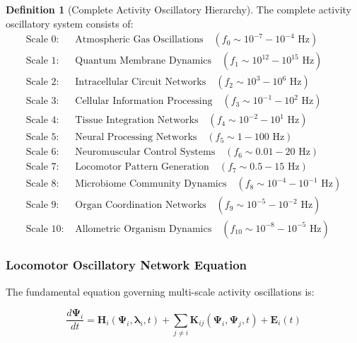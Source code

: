 \documentclass[12pt,a4paper]{article}
\theoremstyle{definition}
\newtheorem{definition}{Definition}[section]
\begin{document}
\begin{definition}[Complete Activity Oscillatory Hierarchy]
The complete activity oscillatory system consists of:
\begin{align}
\text{Scale 0: } &\text{Atmospheric Gas Oscillations} \quad (f_0 \sim 10^{-7}-10^{-4} \text{ Hz}) \label{eq:atmospheric} \\
\text{Scale 1: } &\text{Quantum Membrane Dynamics} \quad (f_1 \sim 10^{12}-10^{15} \text{ Hz}) \label{eq:quantum} \\
\text{Scale 2: } &\text{Intracellular Circuit Networks} \quad (f_2 \sim 10^{3}-10^{6} \text{ Hz}) \label{eq:intracellular} \\
\text{Scale 3: } &\text{Cellular Information Processing} \quad (f_3 \sim 10^{-1}-10^{2} \text{ Hz}) \label{eq:cellular} \\
\text{Scale 4: } &\text{Tissue Integration Networks} \quad (f_4 \sim 10^{-2}-10^{1} \text{ Hz}) \label{eq:tissue} \\
\text{Scale 5: } &\text{Neural Processing Networks} \quad (f_5 \sim 1-100 \text{ Hz}) \label{eq:neural} \\
\text{Scale 6: } &\text{Neuromuscular Control Systems} \quad (f_6 \sim 0.01-20 \text{ Hz}) \label{eq:neuromuscular} \\
\text{Scale 7: } &\text{Locomotor Pattern Generation} \quad (f_7 \sim 0.5-15 \text{ Hz}) \label{eq:locomotor} \\
\text{Scale 8: } &\text{Microbiome Community Dynamics} \quad (f_8 \sim 10^{-4}-10^{-1} \text{ Hz}) \label{eq:microbiome} \\
\text{Scale 9: } &\text{Organ Coordination Networks} \quad (f_9 \sim 10^{-5}-10^{-2} \text{ Hz}) \label{eq:organ} \\
\text{Scale 10: } &\text{Allometric Organism Dynamics} \quad (f_{10} \sim 10^{-8}-10^{-5} \text{ Hz}) \label{eq:allometric}
\end{align}
\end{definition}

\subsubsection{Locomotor Oscillatory Network Equation}

The fundamental equation governing multi-scale activity oscillations is:

\begin{equation}
\frac{d\mathbf{\Psi}_i}{dt} = \mathbf{H}_i(\mathbf{\Psi}_i, \boldsymbol{\lambda}_i, t) + \sum_{j \neq i} \mathbf{K}_{ij}(\mathbf{\Psi}_i, \mathbf{\Psi}_j, t) + \mathbf{E}_i(t)
\label{eq:locomotor_network}
\end{equation}
\end{document}
